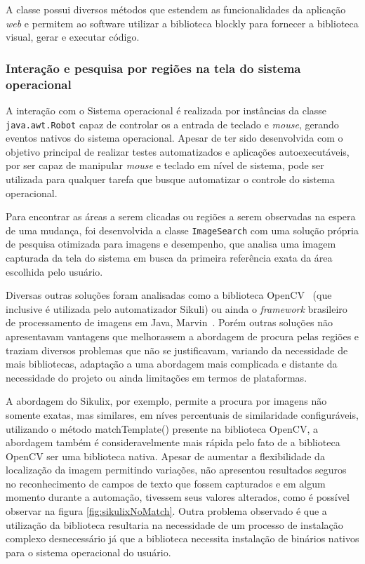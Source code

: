 \documentclass[tg]{mdtufsm}
\begin{document}
                    A classe possui diversos métodos que estendem as funcionalidades da aplicação \emph{web} e permitem ao software utilizar a biblioteca blockly para fornecer a biblioteca visual, gerar e executar código.

                \subsubsection {Interação e pesquisa por regiões na tela do sistema operacional}

                    A interação com o Sistema operacional é realizada por instâncias da classe \texttt{java.awt.Robot} capaz de controlar os a entrada de teclado e \emph{mouse}, gerando eventos nativos do sistema operacional. Apesar de ter sido desenvolvida com o objetivo principal de realizar testes automatizados e aplicações autoexecutáveis, por ser capaz de manipular \emph{mouse} e teclado em nível de sistema, pode ser utilizada para qualquer tarefa que busque automatizar o controle do sistema operacional.

                    Para encontrar as áreas a serem clicadas ou regiões a serem observadas na espera de uma mudança, foi desenvolvida a classe \texttt{ImageSearch} com uma solução própria de pesquisa otimizada para imagens e desempenho, que analisa uma imagem capturada da tela do sistema em busca da primeira referência exata da área escolhida pelo usuário.

                    Diversas outras soluções foram analisadas como a biblioteca OpenCV~\cite{openCV} (que inclusive é utilizada pelo automatizador Sikuli) ou ainda o \emph{framework} brasileiro de processamento de imagens em Java, Marvin~\cite{marvin}. Porém outras soluções não apresentavam vantagens que melhorassem a abordagem de procura pelas regiões e traziam diversos problemas que não se justificavam, variando da necessidade de mais bibliotecas, adaptação a uma abordagem mais complicada e distante da necessidade do projeto ou ainda limitações em termos de plataformas.

                    A abordagem do Sikulix, por exemplo, permite a procura por imagens não somente exatas, mas similares, em níves percentuais de similaridade configuráveis, utilizando o método matchTemplate() presente na biblioteca OpenCV, a abordagem também é consideravelmente mais rápida pelo fato de a biblioteca OpenCV ser uma biblioteca nativa. Apesar de aumentar a flexibilidade da localização da imagem permitindo variações, não apresentou resultados seguros no reconhecimento de campos de texto que fossem capturados e em algum momento durante a automação, tivessem seus valores alterados, como é possível observar na figura \ref{fig:sikulixNoMatch}. Outra problema observado é que a utilização da biblioteca resultaria na necessidade de um processo de instalação complexo desnecessário já que a biblioteca necessita instalação de binários nativos para o sistema operacional do usuário.
\end{document}
